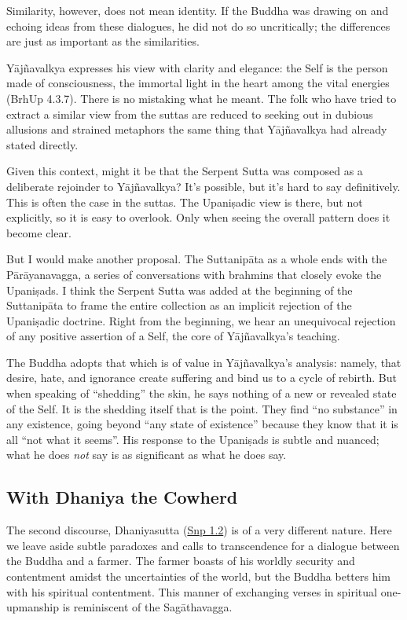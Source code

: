 \documentclass[12pt,openany]{book}%
\begin{document}
Similarity, however, does not mean identity. If the Buddha was drawing on and echoing ideas from these dialogues, he did not do so uncritically; the differences are just as important as the similarities.

\textsanskrit{Yājñavalkya} expresses his view with clarity and elegance: the Self is the person made of consciousness, the immortal light in the heart among the vital energies (BrhUp 4.3.7). There is no mistaking what he meant. The folk who have tried to extract a similar view from the suttas are reduced to seeking out in dubious allusions and strained metaphors the same thing that \textsanskrit{Yājñavalkya} had already stated directly.

Given this context, might it be that the Serpent Sutta was composed as a deliberate rejoinder to \textsanskrit{Yājñavalkya}? It’s possible, but it’s hard to say definitively. This is often the case in the suttas. The \textsanskrit{Upaniṣadic} view is there, but not explicitly, so it is easy to overlook. Only when seeing the overall pattern does it become clear.

But I would make another proposal. The \textsanskrit{Suttanipāta} as a whole ends with the \textsanskrit{Pārāyanavagga}, a series of conversations with brahmins that closely evoke the \textsanskrit{Upaniṣads}. I think the Serpent Sutta was added at the beginning of the \textsanskrit{Suttanipāta} to frame the entire collection as an implicit rejection of the \textsanskrit{Upaniṣadic} doctrine. Right from the beginning, we hear an unequivocal rejection of any positive assertion of a Self, the core of \textsanskrit{Yājñavalkya}’s teaching.

The Buddha adopts that which is of value in \textsanskrit{Yājñavalkya}’s analysis: namely, that desire, hate, and ignorance create suffering and bind us to a cycle of rebirth. But when speaking of “shedding” the skin, he says nothing of a new or revealed state of the Self. It is the shedding itself that is the point. They find “no substance” in any existence, going beyond “any state of existence” because they know that it is all “not what it seems”. His response to the \textsanskrit{Upaniṣads} is subtle and nuanced; what he does \emph{not} say is as significant as what he does say.

\subsection*{With Dhaniya the Cowherd}

The second discourse, Dhaniyasutta (\href{https://suttacentral.net/snp1.2/en/sujato}{Snp 1.2}) is of a very different nature. Here we leave aside subtle paradoxes and calls to transcendence for a dialogue between the Buddha and a farmer. The farmer boasts of his worldly security and contentment amidst the uncertainties of the world, but the Buddha betters him with his spiritual contentment. This manner of exchanging verses in spiritual one-upmanship is reminiscent of the \textsanskrit{Sagāthavagga}.
\end{document}
